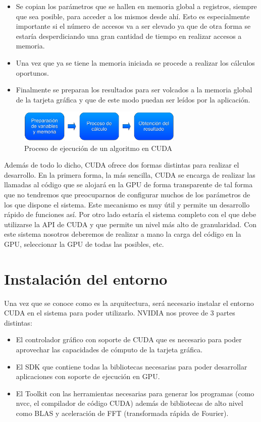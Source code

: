 \begin{itemize}
	\item Se copian los parámetros que se hallen en memoria global a registros, siempre que sea posible, para acceder a los mismos desde ahí. Esto es especialmente importante si el número de accesos va a ser elevado ya que de otra forma se estaría desperdiciando una gran cantidad de tiempo en realizar accesos a memoria.
	\item Una vez que ya se tiene la memoria iniciada se procede a realizar los cálculos oportunos.
	\item Finalmente se preparan los resultados para ser volcados a la memoria global de la tarjeta gráfica y que de este modo puedan ser leídos por la aplicación.
\end{itemize}
 

\begin{figure}
	\centering
	\includegraphics[width=0.7\textwidth]{images/proc_ejec1.pdf}
	\caption{Proceso de ejecución de un algoritmo en CUDA}\label{fig:procejecuda}
\end{figure}

Además de todo lo dicho, CUDA ofrece dos formas distintas para realizar el desarrollo. En la primera forma, la más sencilla, CUDA se encarga de realizar las llamadas al código que se alojará en la GPU de forma transparente de tal forma que no tendremos que preocuparnos de configurar muchos de los parámetros de los que dispone el sistema. Este mecanismo es muy útil y permite un desarrollo rápido de funciones así. Por otro lado estaría el sistema completo con el que debe utilizarse la API de CUDA y que permite un nivel más alto de granularidad. Con este sistema nosotros deberemos de realizar a mano la carga del código en la GPU, seleccionar la GPU de todas las posibles, etc.

\section{Instalación del entorno}

Una vez que se conoce como es la arquitectura, será necesario instalar el entorno CUDA en el sistema para poder utilizarlo. NVIDIA nos provee de 3 partes distintas:

\begin{itemize}
	\item El controlador gráfico con soporte de CUDA que es necesario para poder aprovechar las capacidades de cómputo de la tarjeta gráfica.
	\item El SDK que contiene todas la bibliotecas necesarias para poder desarrollar aplicaciones con soporte de ejecución en GPU.
	\item El Toolkit con las herramientas necesarias para generar los programas (como nvcc, el compilador de código CUDA) además de bibliotecas de alto nivel como BLAS y aceleración de FFT (transformada rápida de Fourier).
\end{itemize}

